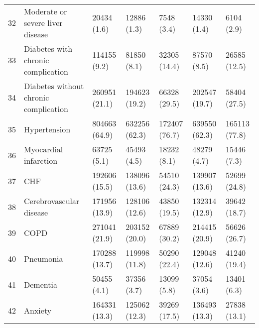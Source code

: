 \begin{tabular}{lllllll}
32 &                   Moderate or severe liver disease &        20434 (1.6) &                   12886 (1.3) &                7548 (3.4) &                    14330 (1.4) &                6104 (2.9) \\
33 &                 Diabetes with chronic complication &       114155 (9.2) &                   81850 (8.1) &              32305 (14.4) &                    87570 (8.5) &              26585 (12.5) \\
34 &              Diabetes without chronic complication &      260951 (21.1) &                 194623 (19.2) &              66328 (29.5) &                  202547 (19.7) &              58404 (27.5) \\
35 &                                       Hypertension &      804663 (64.9) &                 632256 (62.3) &             172407 (76.7) &                  639550 (62.3) &             165113 (77.8) \\
36 &                              Myocardial infarction &        63725 (5.1) &                   45493 (4.5) &               18232 (8.1) &                    48279 (4.7) &               15446 (7.3) \\
37 &                                                CHF &      192606 (15.5) &                 138096 (13.6) &              54510 (24.3) &                  139907 (13.6) &              52699 (24.8) \\
38 &                            Cerebrovascular disease &      171956 (13.9) &                 128106 (12.6) &              43850 (19.5) &                  132314 (12.9) &              39642 (18.7) \\
39 &                                               COPD &      271041 (21.9) &                 203152 (20.0) &              67889 (30.2) &                  214415 (20.9) &              56626 (26.7) \\
40 &                                          Pneumonia &      170288 (13.7) &                 119998 (11.8) &              50290 (22.4) &                  129048 (12.6) &              41240 (19.4) \\
41 &                                           Dementia &        50455 (4.1) &                   37356 (3.7) &               13099 (5.8) &                    37054 (3.6) &               13401 (6.3) \\
42 &                                            Anxiety &      164331 (13.3) &                 125062 (12.3) &              39269 (17.5) &                  136493 (13.3) &              27838 (13.1) \\

\end{tabular}
